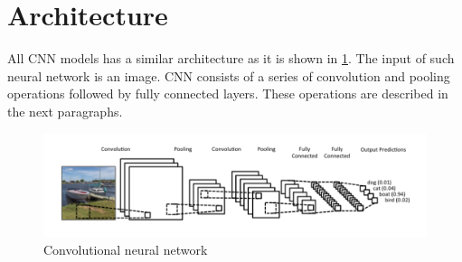 \documentclass[twoside]{ctuthesis}
\theoremstyle{plain}
\theoremstyle{definition}
\theoremstyle{note}
\begin{document}
\section{Architecture}
All CNN models has a similar architecture as it is shown in \ref{conv_full}. The input of such neural network is an image. CNN consists of a series of convolution and pooling operations followed by fully connected layers. These operations are described in the next paragraphs. 
\begin{figure}[h]
\caption{Convolutional neural network\cite{britz_2016}}
\label{conv_full}
\includegraphics[width=\textwidth]{images/neural_networks/conv_full.png}
\end{figure}
\end{document}
